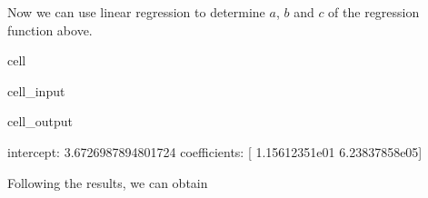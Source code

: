 \documentclass[letterpaper,10pt,english]{jupyterBook}
\begin{document}
\sphinxAtStartPar
Now we can use linear regression to determine \(a\), \(b\) and \(c\) of the regression function above.

\begin{sphinxuseclass}{cell}\begin{sphinxVerbatimInput}

\begin{sphinxuseclass}{cell_input}
\begin{sphinxVerbatim}[commandchars=\\\{\}]
  \PYG{p}{[}\PYG{p}{[}\PYG{p}{]}\PYG{p}{]}
  \PYG{p}{[}\PYG{p}{]}
  

  
  \PYG{p}{[}\PYG{p}{]}
  \PYG{p}{[}\PYG{p}{]}
\end{sphinxVerbatim}

\end{sphinxuseclass}\end{sphinxVerbatimInput}
\begin{sphinxVerbatimOutput}

\begin{sphinxuseclass}{cell_output}
\begin{sphinxVerbatim}[commandchars=\\\{\}]
intercept: 3.6726987894801724
coefficients: [ 1.15612351e\PYGZhy{}01 \PYGZhy{}6.23837858e\PYGZhy{}05]
\end{sphinxVerbatim}

\end{sphinxuseclass}\end{sphinxVerbatimOutput}

\end{sphinxuseclass}
\sphinxAtStartPar
Following the results, we can obtain
\end{document}
